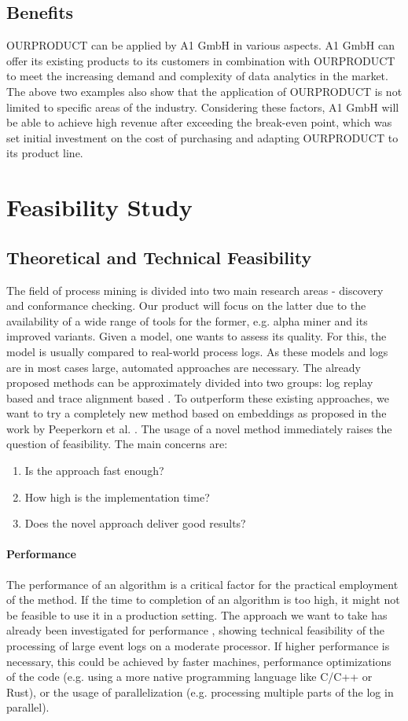 \documentclass{article}
\begin{document}
\subsection{Benefits}
OURPRODUCT can be applied by A1 GmbH in various aspects. A1 GmbH can offer its existing products to its customers in combination with OURPRODUCT to meet the increasing demand and complexity of data analytics in the market. The above two examples also show that the application of OURPRODUCT is not limited to specific areas of the industry. Considering these factors, A1 GmbH will be able to achieve high revenue after exceeding the break-even point, which was set initial investment on the cost of purchasing and adapting OURPRODUCT to its product line. 

\section{Feasibility Study}

\subsection{Theoretical and Technical Feasibility}
The field of process mining is divided into two main research areas - discovery and conformance checking.
Our product will focus on the latter due to the availability of a wide range of tools for the former, e.g. alpha miner \cite{alphaminer} and its improved variants.
Given a model, one wants to assess its quality.
For this, the model is usually compared to real-world process logs.
As these models and logs are in most cases large, automated approaches are necessary.
The already proposed methods can be approximately divided into two groups: log replay based and trace alignment based \cite{thebible}.
To outperform these existing approaches, we want to try a completely new method based on embeddings as proposed in the work by Peeperkorn et al. \cite{source}.
The usage of a novel method immediately raises the question of feasibility.
The main concerns are:
\begin{enumerate}
    \item Is the approach fast enough?
    \item How high is the implementation time?
    \item Does the novel approach deliver good results?
\end{enumerate}

\paragraph{Performance} The performance of an algorithm is a critical factor for the practical employment of the method.
If the time to completion of an algorithm is too high, it might not be feasible to use it in a production setting.
The approach we want to take has already been investigated for performance \cite{source}, showing technical feasibility of the processing of large event logs on a moderate processor.
If higher performance is necessary, this could be achieved by faster machines, performance optimizations of the code (e.g. using a more native programming language like C/C++ or Rust), or the usage of parallelization (e.g. processing multiple parts of the log in parallel).
\end{document}

